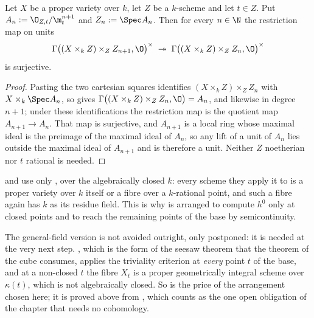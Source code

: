 \begin{lemma}
\label{lem:cube-thickening-units}
\leanok
Let $X$ be a proper variety over $k$, let $Z$ be a $k$-scheme and let $t\in Z$.
Put $A_n:=\O_{Z,t}/\m_t^{n+1}$ and $Z_n:=\Spec A_n$.  Then for every $n\in\N$
the restriction map on units
\[
  \Gamma\bigl((X\times_kZ)\times_ZZ_{n+1},\O\bigr)^\times
  \;\twoheadrightarrow\;
  \Gamma\bigl((X\times_kZ)\times_ZZ_n,\O\bigr)^\times
\]
is surjective.
\end{lemma}
\begin{proof}
\leanok
Pasting the two cartesian squares identifies $(X\times_kZ)\times_ZZ_n$ with
$X\times_k\Spec A_n$, so  gives
$\Gamma\bigl((X\times_kZ)\times_ZZ_n,\O\bigr)=A_n$, and likewise in degree
$n+1$; under these identifications the restriction map is the quotient map
$A_{n+1}\to A_n$.  That map is surjective, and $A_{n+1}$ is a local ring whose
maximal ideal is the preimage of the maximal ideal of $A_n$, so any lift of a
unit of $A_n$ lies outside the maximal ideal of $A_{n+1}$ and is therefore a
unit.  Neither $Z$ noetherian nor $t$ rational is needed.
\end{proof}

\begin{remark}
\label{rem:cube-general-field}
 and  use only
, over the algebraically closed $k$: every
scheme they apply it to is a proper variety over $k$ itself or a fibre over a
$k$-rational point, and such a fibre again has $k$ as its residue field.  This
is why  is arranged to compute $h^0$ only at
closed points and to reach the remaining points of the base by
semicontinuity.

The general-field version is not avoided outright, only postponed: it is
needed at the very next step.  , which is the
form of the seesaw theorem that the theorem of the cube consumes, applies the
triviality criterion  at \emph{every}
point $t$ of the base, and at a non-closed $t$ the fibre $X_t$ is a proper
geometrically integral scheme over $\kappa(t)$, which is not algebraically
closed.  So  is the price of the
arrangement chosen here; it is proved above from
, which
 counts as the one open obligation of the chapter that
needs no cohomology.
\end{remark}

